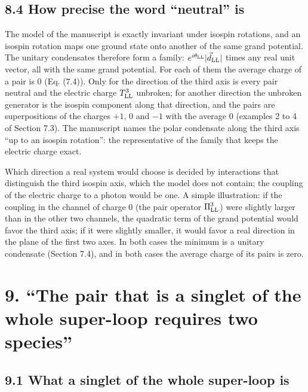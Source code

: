 \documentclass[
  10pt,
]{article}
\begin{document}
\hypertarget{how-precise-the-word-neutral-is}{%
\subsection{8.4 How precise the word ``neutral''
is}\label{how-precise-the-word-neutral-is}}

The model of the manuscript is exactly invariant under isospin
rotations, and an isospin rotation maps one ground state onto another of
the same grand potential. The unitary condensates therefore form a
family: \(e^{i\theta_{\rm LL}}\lvert\vec d_{\rm LL}\rvert\) times any
real unit vector, all with the same grand potential. For each of them
the average charge of a pair is 0 (Eq. (7.4)). Only for the direction of
the third axis is every pair neutral and the electric charge
\(T^3_{\rm LL}\) unbroken; for another direction the unbroken generator
is the isospin component along that direction, and the pairs are
superpositions of the charges \(+1\), 0 and \(-1\) with the average 0
(examples 2 to 4 of Section 7.3). The manuscript names the polar
condensate along the third axis ``up to an isospin rotation'': the
representative of the family that keeps the electric charge exact.

Which direction a real system would choose is decided by interactions
that distinguish the third isospin axis, which the model does not
contain; the coupling of the electric charge to a photon would be one. A
simple illustration: if the coupling in the channel of charge 0 (the
pair operator \(\Pi^3_{\rm LL}\)) were slightly larger than in the other
two channels, the quadratic term of the grand potential would favor the
third axis; if it were slightly smaller, it would favor a real direction
in the plane of the first two axes. In both cases the minimum is a
unitary condensate (Section 7.4), and in both cases the average charge
of its pairs is zero.

\hypertarget{the-pair-that-is-a-singlet-of-the-whole-super-loop-requires-two-species}{%
\section{9. ``The pair that is a singlet of the whole super-loop
requires two
species''}\label{the-pair-that-is-a-singlet-of-the-whole-super-loop-requires-two-species}}

\hypertarget{what-a-singlet-of-the-whole-super-loop-is}{%
\subsection{9.1 What a singlet of the whole super-loop
is}\label{what-a-singlet-of-the-whole-super-loop-is}}
\end{document}
